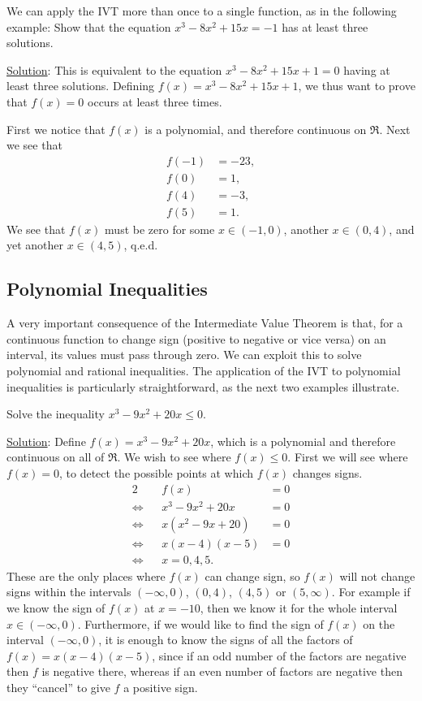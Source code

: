 We can apply the IVT 
more than once to a single function, as in the following example:
\bex Show that the equation $x^3-8x^2+15x=-1$ has 
at least three solutions.
\nopagebreak

\underline{Solution}: This is equivalent to the
equation $x^3-8x^2+15x+1=0$ having at least three solutions.
Defining $f(x)=x^3-8x^2+15x+1$, we thus want to prove
that $f(x)=0$ occurs at least three times.

First we notice that $f(x)$ is a polynomial, and therefore
continuous on  $\Re$.  Next we see that
\begin{align*}
f(-1)&=-23,\\
f(0)&=1,\\
f(4)&=-3,\\
f(5)&=1.
\end{align*}
We see that $f(x)$ must be zero for some $x\in(-1,0)$,
another $x\in(0,4)$, and yet another $x\in(4,5)$, q.e.d.
\eex

\subsection{Polynomial Inequalities}
A very important consequence of the Intermediate Value
Theorem is that, for a continuous function to change sign
(positive to negative or vice versa) on an interval,
its values must pass through zero.
We can exploit this to solve polynomial
and rational inequalities.  The application of the IVT
to polynomial inequalities is particularly straightforward,
as the next two examples illustrate.

\bex Solve the inequality $x^3-9x^2+20x\le0$.
\nopagebreak

\underline{Solution}: Define $f(x)=x^3-9x^2+20x$, which
is a polynomial and therefore continuous on all of $\Re$.  We wish
to see where $f(x)\le0$.  First we will see where $f(x)=0$,
to detect the possible points at which $f(x)$ changes signs.
\begin{alignat*}{2}
&&f(x)&=0\\
\iff&&x^3-9x^2+20x&=0\\
\iff&&x(x^2-9x+20)&=0\\
\iff&&x(x-4)(x-5)&=0\\
\iff&&x=0,4,5.\end{alignat*}
These are the only places where $f(x)$ can change 
sign, so $f(x)$ will not change signs within
the intervals $(-\infty,0)$, $(0,4)$, $(4,5)$ or $(5,\infty)$.
For example if we know the sign of $f(x)$ at $x=-10$, then
we know it for the whole interval $x\in(-\infty,0)$.
Furthermore, if we would like to find the sign of $f(x)$
on the interval $(-\infty,0)$, it is enough to know
the signs of all the factors of $f(x)=x(x-4)(x-5)$, since
 if an odd number of the factors are negative then $f$
is negative there, whereas if an even number of factors
are negative then they ``cancel'' to give $f$ a positive 
sign.

